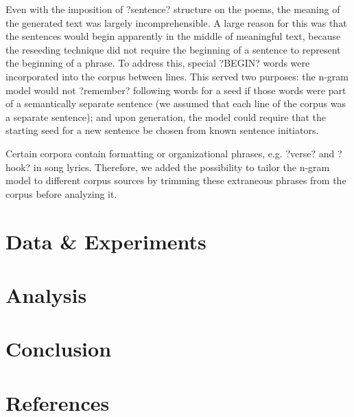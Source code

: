 \documentclass[10pt,twocolumn]{article}
\begin{document}
Even with the imposition of ?sentence? structure on the poems, the meaning of the generated text was largely incomprehensible. A large reason for this was that the sentences would begin apparently in the middle of meaningful text, because the reseeding technique did not require the beginning of a sentence to represent the beginning of a phrase. To address this, special ?BEGIN? words were incorporated into the corpus between lines. This served two purposes: the n-gram model would not ?remember? following words for a seed if those words were part of a semantically separate sentence (we assumed that each line of the corpus was a separate sentence); and upon generation, the model could require that the starting seed for a new sentence be chosen from known sentence initiators.

Certain corpora contain formatting or organizational phrases, e.g. ?verse? and ?hook? in song lyrics. Therefore, we added the possibility to tailor the n-gram model to different corpus sources by trimming these extraneous phrases from the corpus before analyzing it.




\section{Data \& Experiments}

\section {Analysis}

\section{Conclusion}

\section{References}
\end{document}
